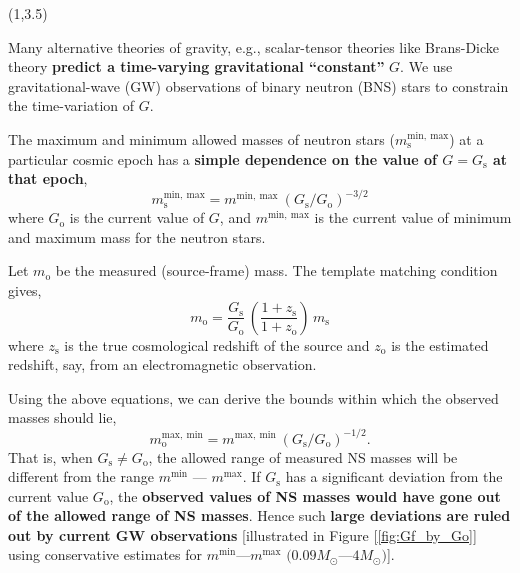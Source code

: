 \documentclass[a1,portrait]{a1poster}
\newcommand{\headingcolor}{\color{BannerElevenColor}}
\newcommand{\ms}{m_\mathrm{s}}
\newcommand{\mo}{m_\mathrm{o}}
\newcommand{\zs}{z_\mathrm{s}}
\newcommand{\zo}{z_\mathrm{o}}
\newcommand{\Gs}{G_\mathrm{s}}
\newcommand{\Go}{G_\mathrm{o}}
\def\LHead#1{\noindent{\LARGE \headingcolor #1}\smallskip}
\begin{document}


\begin{textblock}{7}(1,3.5)	%
\LHead{Background}

Many alternative theories of gravity, e.g., scalar-tensor theories like Brans-Dicke theory \textbf{predict a time-varying gravitational ``constant''} $G$. We use gravitational-wave (GW) observations of binary neutron (BNS) stars to constrain the time-variation of $G$.

The maximum and minimum allowed masses of neutron stars ($\ms^\mathrm{min,~max}$) at a particular cosmic epoch has a \textbf{simple dependence on the value of $G=\Gs$ at that epoch},
\begin{equation}
\ms^\mathrm{min,~max} = m^\mathrm{min,~max} ~ (\Gs/\Go)^{-3/2}
\label{eq:m_max_min}
\end{equation}
where $\Go$ is the current value of $ G $, and $m^\mathrm{min,~max}$ is the current value of minimum and maximum mass for the neutron stars.

Let $ \mo $ be the measured (source-frame) mass. The template matching condition gives,
\begin{equation}
\mo = \frac{\Gs}{\Go} \, \left(\frac{1+\zs}{1+\zo}\right) \, \ms
\label{eq:m_obs_with_z}
\end{equation}
where $\zs$ is the true cosmological redshift of the source and $\zo$ is the estimated redshift, say, from an electromagnetic observation.

Using the above equations, we can derive the bounds within which the observed masses should lie,
\begin{equation}
\mo^\mathrm{max,~min} = m^\mathrm{max,~min}~(\Gs/\Go)^{-1/2}. 
\label{eq:m_obs_fn_Gf}
\end{equation}
That is, when $\Gs \neq \Go$, the allowed range of measured NS masses will be different from the range $m^\mathrm{min}$ --- $m^\mathrm{max}$. If $\Gs$ has a significant deviation from the current value $\Go$, the \textbf{observed values of NS masses  would have gone out of the allowed range of NS masses}. Hence such \textbf{large deviations are ruled out by current GW observations} [illustrated in Figure [\ref{fig:Gf_by_Go}] using conservative estimates for $m^\mathrm{min}$---$m^\mathrm{max}$ $(0.09 M_{\odot}$---$4M_{\odot})$].


\end{textblock}
\end{document}

